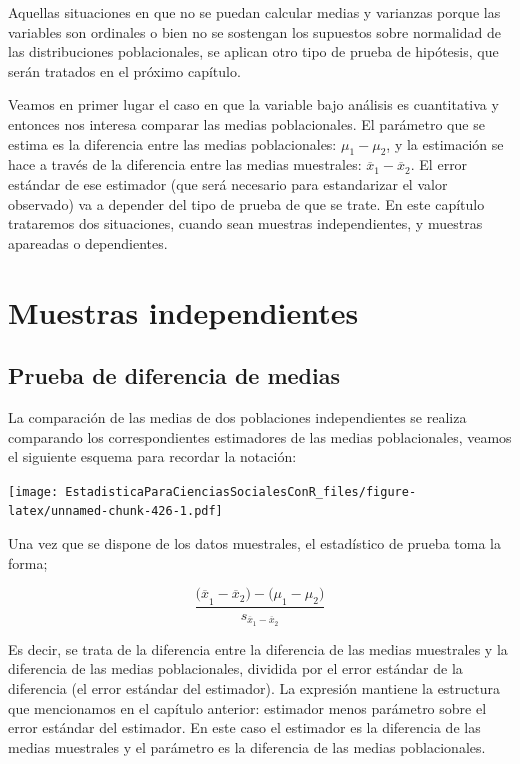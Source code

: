 \documentclass[]{book}
\begin{document}
Aquellas situaciones en que no se puedan calcular medias y varianzas
porque las variables son ordinales o bien no se sostengan los supuestos
sobre normalidad de las distribuciones poblacionales, se aplican otro
tipo de prueba de hipótesis, que serán tratados en el próximo capítulo.

Veamos en primer lugar el caso en que la variable bajo análisis es
cuantitativa y entonces nos interesa comparar las medias poblacionales.
El parámetro que se estima es la diferencia entre las medias
poblacionales: \(\mu_{1} - \mu_{2}\), y la estimación se hace a través de
la diferencia entre las medias muestrales:
\({\overline{x}}_{1} - {\overline{x}}_{2}\). El error estándar de ese
estimador (que será necesario para estandarizar el valor observado) va a depender del tipo de prueba de que se trate. En este capítulo trataremos
dos situaciones, cuando sean muestras independientes, y muestras
apareadas o dependientes.

\hypertarget{muestras-independientes}{%
\section{Muestras independientes}\label{muestras-independientes}}

\hypertarget{prueba-de-diferencia-de-medias}{%
\subsection{Prueba de diferencia de medias}\label{prueba-de-diferencia-de-medias}}

La comparación de las medias de dos poblaciones independientes se
realiza comparando los correspondientes estimadores de las medias
poblacionales, veamos el siguiente esquema para recordar la notación:

\texttt{[image: EstadisticaParaCienciasSocialesConR\_files/figure-latex/unnamed-chunk-426-1.pdf]}

Una vez que se dispone de los datos muestrales, el estadístico de prueba toma la forma;

\[\frac{{(\overline{x}}_{1} - {\overline{x}}_{2}) - {(\mu}_{1} - \mu_{2})}{s_{{\overline{x}}_{1} - {\overline{x}}_{2}}}\]

Es decir, se trata de la diferencia entre la diferencia de las medias
muestrales y la diferencia de las medias poblacionales, dividida por el
error estándar de la diferencia (el error estándar del estimador). La
expresión mantiene la estructura que mencionamos en el capítulo
anterior: estimador menos parámetro sobre el error estándar del
estimador. En este caso el estimador es la diferencia de las medias
muestrales y el parámetro es la diferencia de las medias poblacionales.
\end{document}
